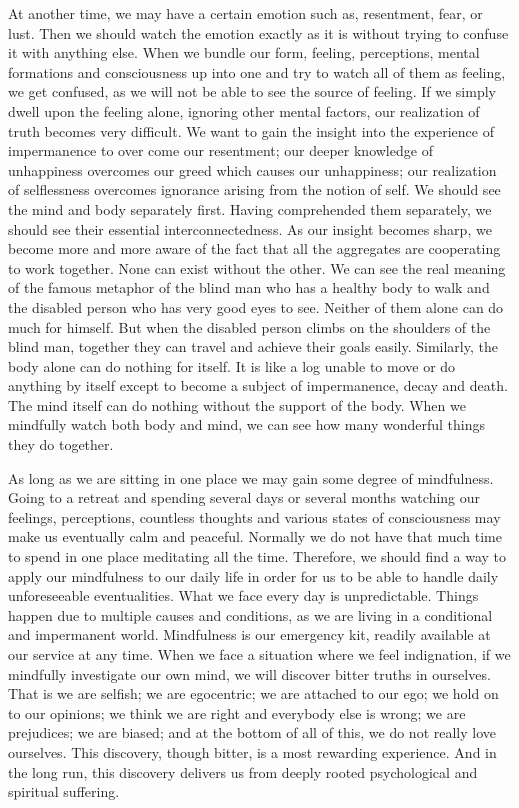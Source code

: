 At another time, we may have a certain emotion such as, resentment, fear, or
lust. Then we should watch the emotion exactly as it is without trying to
confuse it with anything else. When we bundle our form, feeling, perceptions,
mental formations and consciousness up into one and try to watch all of them as feeling, we
get confused, as we will not be able to see the source of feeling. If we simply
dwell upon the feeling alone, ignoring other mental factors, our realization of
truth becomes very difficult. We want to gain the insight into the experience of
impermanence to over come our resentment; our deeper knowledge of unhappiness
overcomes our greed which causes our unhappiness; our realization of
selflessness overcomes ignorance arising from the notion of self. We should see
the mind and body separately first. Having comprehended them separately, we
should see their essential interconnectedness. As our insight becomes sharp, we
become more and more aware of the fact that all the aggregates are cooperating
to work together. None can exist without the other. We can see the real meaning
of the famous metaphor of the blind man who has a healthy body to walk and the
disabled person who has very good eyes to see. Neither of them alone can do much
for himself. But when the disabled person climbs on the shoulders of the blind
man, together they can travel and achieve their goals easily. Similarly, the
body alone can do nothing for itself. It is like a log unable to move or do
anything by itself except to become a subject of impermanence, decay and death.
The mind itself can do nothing without the support of the body. When we
mindfully watch both body and mind, we can see how many wonderful things they do
together.

As long as we are sitting in one place we may gain some degree of mindfulness.
Going to a retreat and spending several days or several months watching our
feelings, perceptions, countless thoughts and various states of consciousness
may make us eventually calm and peaceful. Normally we do not have that much time
to spend in one place meditating all the time. Therefore, we should find a way
to apply our mindfulness to our daily life in order for us to be able to handle
daily unforeseeable eventualities. What we face every day is unpredictable.
Things happen due to multiple causes and conditions, as we are living in a
conditional and impermanent world. Mindfulness is our emergency kit, readily
available at our service at any time. When we face a situation where we feel
indignation, if we mindfully investigate our own mind, we will discover bitter
truths in ourselves. That is we are selfish; we are egocentric; we are attached
to our ego; we hold on to our opinions; we think we are right and everybody else
is wrong; we are prejudices; we are biased; and at the bottom of all of this, we
do not really love ourselves. This discovery, though bitter, is a most rewarding
experience. And in the long run, this discovery delivers us from deeply rooted
psychological and spiritual suffering.

